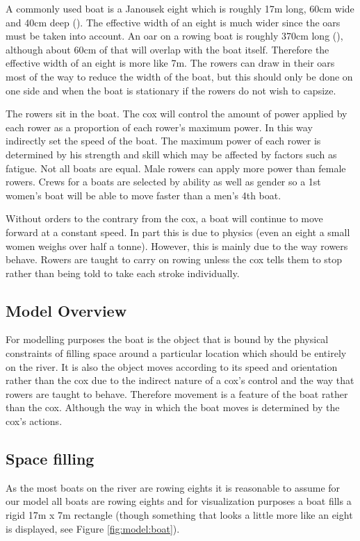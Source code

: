       A commonly used boat is a Janousek eight which is roughly 17m long, 60cm wide and 40cm deep (\cite{Janousek}). The effective width of an eight is much wider since the oars must be taken into account. An oar on a rowing boat is roughly 370cm long (\cite{Concept2}), although about 60cm of that will overlap with the boat itself. Therefore the effective width of an eight is more like 7m. The rowers can draw in their oars most of the way to reduce the width of the boat, but this should only be done on one side and when the boat is stationary if the rowers do not wish to capsize. 
      
      The rowers sit in the boat. The cox will control the amount of power applied by each rower as a proportion of each rower's maximum power. In this way indirectly set the speed of the boat. The maximum power of each rower is determined by his strength and skill which may be affected by factors such as fatigue. Not all boats are equal. Male rowers can apply more power than female rowers. Crews for a boats are selected by ability as well as gender so a 1st women's boat will be able to move faster than a men's 4th boat.
      
      Without orders to the contrary from the cox, a boat will continue to move forward at a constant speed. In part this is due to physics (even an eight a small women weighs over half a tonne). However, this is mainly due to the way rowers behave. Rowers are taught to carry on rowing unless the cox tells them to stop rather than being told to take each stroke individually.
      
      \subsection{Model Overview}\label{model:boat:simplified}
      For modelling purposes the boat is the object that is bound by the physical constraints of filling space around a particular location which should be entirely on the river. It is also the object moves according to its speed and orientation rather than the cox due to the indirect nature of a cox's control and the way that rowers are taught to behave. Therefore movement is a feature of the boat rather than the cox. Although the way in which the boat moves is determined by the cox's actions.
      
      \subsection{Space filling}\label{model:boat:space_filling}
      As the most boats on the river are rowing eights it is reasonable to assume for our model all boats are rowing eights and for visualization purposes a boat fills a rigid 17m x 7m rectangle (though something that looks a little more like an eight is displayed, see Figure \ref{fig:model:boat}). 
      
